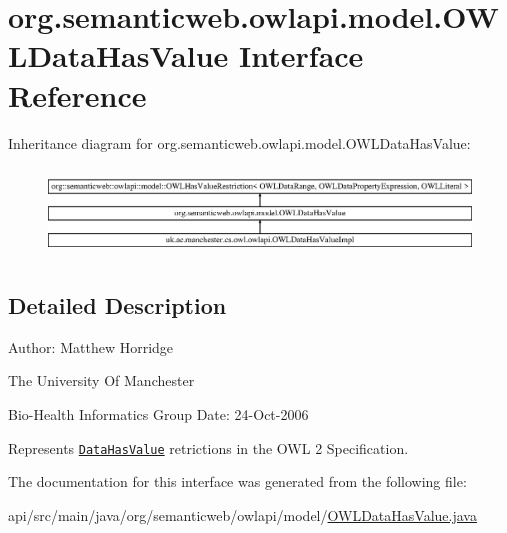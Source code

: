 \hypertarget{interfaceorg_1_1semanticweb_1_1owlapi_1_1model_1_1_o_w_l_data_has_value}{\section{org.\-semanticweb.\-owlapi.\-model.\-O\-W\-L\-Data\-Has\-Value Interface Reference}
\label{interfaceorg_1_1semanticweb_1_1owlapi_1_1model_1_1_o_w_l_data_has_value}
}
Inheritance diagram for org.\-semanticweb.\-owlapi.\-model.\-O\-W\-L\-Data\-Has\-Value\-:\begin{figure}[H]
\begin{center}
\leavevmode
\includegraphics[height=2.379603cm]{interfaceorg_1_1semanticweb_1_1owlapi_1_1model_1_1_o_w_l_data_has_value}
\end{center}
\end{figure}


\subsection{Detailed Description}
Author\-: Matthew Horridge\par
 The University Of Manchester\par
 Bio-\/\-Health Informatics Group Date\-: 24-\/\-Oct-\/2006 

Represents \href{http://www.w3.org/TR/2009/REC-owl2-syntax-20091027/#Literal_Value_Restriction}{\tt Data\-Has\-Value} retrictions in the O\-W\-L 2 Specification. 

The documentation for this interface was generated from the following file\-:\begin{DoxyCompactItemize}
\item 
api/src/main/java/org/semanticweb/owlapi/model/\hyperlink{_o_w_l_data_has_value_8java}{O\-W\-L\-Data\-Has\-Value.\-java}\end{DoxyCompactItemize}
